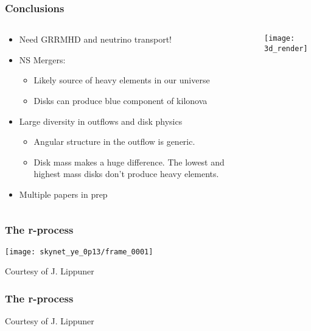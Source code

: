 \documentclass[]{beamer}
\newcommand{\backupbegin}{
   \newcounter{finalframe}
   \setcounter{finalframe}{\value{framenumber}}
}
\begin{document}
\begin{frame}
  \frametitle{Conclusions}
  \begin{columns}
    \begin{column}{7cm}
      \begin{itemize}
      \item Need GRRMHD and neutrino transport!
      \item NS Mergers:
        \begin{itemize}
        \item Likely source of heavy elements in our
          universe
        \item Disks can produce blue component of kilonova
        \end{itemize}
      \item Large diversity in outflows and disk physics
        \begin{itemize}
        \item Angular structure in the outflow is generic.
        \item Disk mass makes a huge difference. The lowest and
          highest mass disks don't produce heavy elements.
        \end{itemize}
      \item Multiple papers in prep
      \end{itemize}
    \end{column}
    \begin{column}{5cm}
      \texttt{[image: 3d\_render]}
    \end{column}
  \end{columns}
\end{frame}

\backupbegin

\begin{frame}
 \frametitle{The r-process}
 \begin{center}
  \texttt{[image: skynet\_ye\_0p13/frame\_0001]}
 \end{center}
 Courtesy of J. Lippuner
\end{frame}

\begin{frame}
 \frametitle{The r-process}
 \begin{center}
 \end{center}
 Courtesy of J. Lippuner
\end{frame}
\end{document}
